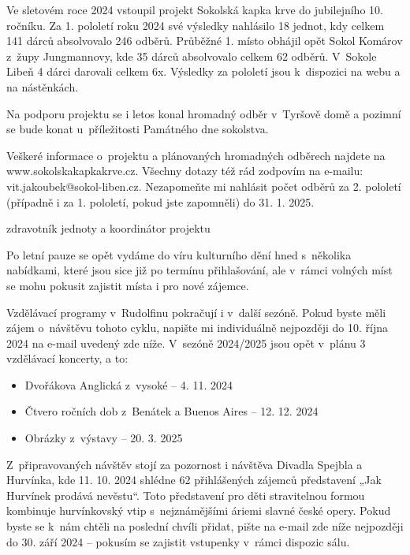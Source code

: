\documentclass[11pt]{article}
\begin{document}
Ve sletovém roce 2024 vstoupil projekt Sokolská kapka krve do jubilejního 10. ročníku. 
Za 1. pololetí roku 2024 své výsledky nahlásilo 18 jednot, kdy celkem 141 dárců absolvovalo 246 odběrů.
Průběžné 1. místo obhájil opět Sokol Komárov z~župy Jungmannovy, kde 35 dárců absolvovalo celkem 62 odběrů. V~Sokole Libeň 4 dárci darovali celkem 6x. Výsledky za pololetí jsou k~dispozici na webu a na nástěnkách. 

Na podporu projektu se i letos konal hromadný odběr v~Tyršově domě a pozimní se bude konat u~příležitosti Památného dne sokolstva. 

Veškeré informace o~projektu a plánovaných hromadných odběrech najdete na www.sokolskakapkakrve.cz. Všechny dotazy též rád zodpovím na e-mailu: vit.jakoubek@sokol-liben.cz. Nezapomeňte mi nahlásit počet odběrů za 2. pololetí (případně i za 1. pololetí, pokud jste zapomněli) do 31. 1. 2025.

\signature{Vít Jakoubek}{zdravotník jednoty a koordinátor projektu}
\vspace*{24pt}

Po letní pauze se opět vydáme do víru kulturního dění hned s~několika nabídkami, které jsou sice již po termínu přihlašování, ale v~rámci volných míst se mohu pokusit zajistit místa i pro nové zájemce.

Vzdělávací programy v~Rudolfinu pokračují i v~další sezóně. Pokud byste měli zájem o~návštěvu tohoto cyklu, napište mi individuálně nejpozději do 10. října 2024 na e-mail uvedený zde níže. V~sezóně 2024/2025 jsou opět v~plánu 3 vzdělávací koncerty, a to:

\renewcommand{\arraystretch}{1}
\begin{itemize}
  \setlength\itemsep{-3pt}
  \item Dvořákova Anglická z~vysoké – 4. 11. 2024
  \item Čtvero ročních dob z~Benátek a Buenos Aires – 12. 12. 2024
  \item Obrázky z~výstavy – 20. 3. 2025
\end{itemize}

Z~připravovaných návštěv stojí za pozornost i návštěva Divadla Spejbla a Hurvínka, kde 11. 10. 2024 shlédne 62 přihlášených zájemců představení „Jak Hurvínek prodává nevěstu“. Toto představení pro děti stravitelnou formou kombinuje hurvínkovský vtip s~nejznámějšími áriemi slavné české opery. Pokud byste se k~nám chtěli na poslední chvíli přidat, pište na e-mail zde níže nejpozději do 30. září 2024 – pokusím se zajistit vstupenky v~rámci dispozic sálu.
\end{document}
